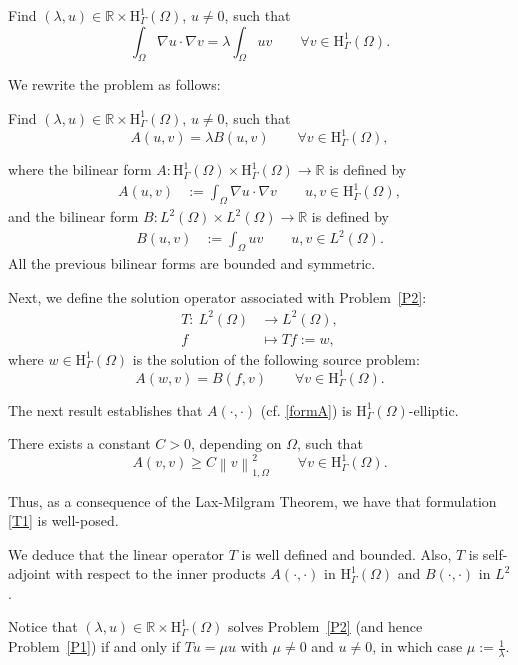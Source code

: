 \documentclass[onefignum,onetabnum,final]{siamart250211}
\numberwithin{equation}{section}
\newcommand\0{\boldsymbol{0}}
\newcommand\R{\mathbb{R}}
\renewcommand\O{\Omega}
\newcommand\G{\Gamma}
\renewcommand\H{\mathrm{H}}
\newcommand\HcuO{\H_{\G}^1(\O)}
\def\l{\lambda}
\begin{document}
	\begin{problem}
		\label{P1}
		Find $(\l,u)\in\R\times\HcuO$, $u\ne0$, such that
		$$
		\int_{\O}\nabla u\cdot\nabla v
		=\l\int_{\O}uv\qquad\forall v\in\HcuO.
		$$
	\end{problem}
	
	We rewrite the problem as follows:
	\begin{problem}
		\label{P2}
		Find $(\l,u)\in\R\times\HcuO$, $u\ne0$, such that
		$$
		A(u,v)=\l B(u,v)\qquad\forall v\in\HcuO,
		$$
	\end{problem}
	where the bilinear form $A:\HcuO\times\HcuO\rightarrow\mathbb{R}$
	is defined by
	\begin{align}\label{formA}
		A(u,v)
		& :=\int_{\O}\nabla u\cdot\nabla v \qquad u,v\in\HcuO,
	\end{align}
	and the bilinear form $B:L^2(\Omega)\times L^2(\Omega)\rightarrow\mathbb{R}$
	is defined by
	\begin{align*}
		B(u,v)
		& :=\int_{\O}uv \qquad u,v\in L^2(\Omega).
	\end{align*}
	All the previous bilinear forms are bounded and symmetric.
	
	Next, we define the solution operator associated with Problem~\ref{P2}:
	\begin{align*}
		T:\ L^2(\Omega) & \longrightarrow L^2(\Omega),
		\\
		f & \longmapsto Tf:=w,
	\end{align*}
	where $w\in\HcuO$ is the solution of the following source problem:
	\begin{equation}
		\label{T1}
		A(w,v)=B(f,v)
		\qquad\forall v\in\HcuO.
	\end{equation}
	
	The next result establishes that $A(\cdot,\cdot)$ (cf. \eqref{formA}) is $\HcuO$-elliptic.
	\begin{lemma}
		\label{elipt}
		There exists a constant $C>0$, depending on $\O$, such that
		$$
		A(v,v)
		\ge C\left\|v\right\|_{1,\O}^2
		\qquad\forall v\in\HcuO.
		$$
	\end{lemma}
	Thus, as a consequence of the Lax-Milgram Theorem, we have that
	formulation \eqref{T1} is well-posed.
	
	We deduce that the linear operator $T$ is well
	defined and bounded. Also, $T$  is self-adjoint with respect to
	the inner products $A(\cdot,\cdot)$ in $\HcuO$ and $B(\cdot,\cdot)$ in $L^2$.
	
	Notice that $(\l,u)\in\R\times\HcuO$ solves
	Problem~\ref{P2} (and hence Problem~\ref{P1}) if and only if $Tu=\mu u$
	with $\mu\neq0$ and $u\ne0$, in which case $\mu:=\frac{1}{\l}$.
	
\end{document}
